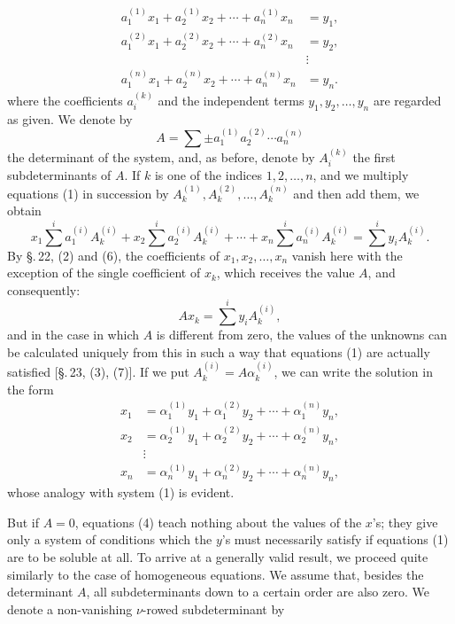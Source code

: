 
\begin{equation}
\begin{aligned}
 a_1^{(1)}x_1+a_2^{(1)}x_2+\cdots+a_n^{(1)}x_n&=y_1,\\
 a_1^{(2)}x_1+a_2^{(2)}x_2+\cdots+a_n^{(2)}x_n&=y_2,\\
 &\vdots\\
 a_1^{(n)}x_1+a_2^{(n)}x_2+\cdots+a_n^{(n)}x_n&=y_n.
\end{aligned}
\tag{1}
\end{equation}
where the coefficients \(a_i^{(k)}\) and the independent terms \(y_1,y_2,\ldots,y_n\) are regarded as given. We denote by
\begin{equation}
        A=\sum\pm a_1^{(1)}a_2^{(2)}\cdots a_n^{(n)}
\tag{2}
\end{equation}
the determinant of the system, and, as before, denote by \(A_i^{(k)}\) the first subdeterminants of \(A\). If \(k\) is one of the indices \(1,2,\ldots,n\), and we multiply equations (1) in succession by \(A_k^{(1)},A_k^{(2)},\ldots,A_k^{(n)}\) and then add them, we obtain
\begin{equation}
 x_1\sum^{i}a_1^{(i)}A_k^{(i)}+
 x_2\sum^{i}a_2^{(i)}A_k^{(i)}+
 \cdots+
 x_n\sum^{i}a_n^{(i)}A_k^{(i)}
 =\sum^{i}y_iA_k^{(i)}.
\tag{3}
\end{equation}
By \S.\,22, (2) and (6), the coefficients of \(x_1,x_2,\ldots,x_n\) vanish here with the exception of the single coefficient of \(x_k\), which receives the value \(A\), and consequently:
\begin{equation}
 A x_k=\sum^{i}y_iA_k^{(i)},
\tag{4}
\end{equation}
and in the case in which \(A\) is different from zero, the values of the unknowns can be calculated uniquely from this in such a way that equations (1) are actually satisfied [\S.\,23, (3), (7)]. If we put \(A_k^{(i)}=A\alpha_k^{(i)}\), we can write the solution in the form
\begin{equation}
\begin{aligned}
 x_1&=\alpha_1^{(1)}y_1+\alpha_1^{(2)}y_2+\cdots+\alpha_1^{(n)}y_n,\\
 x_2&=\alpha_2^{(1)}y_1+\alpha_2^{(2)}y_2+\cdots+\alpha_2^{(n)}y_n,\\
 &\vdots\\
 x_n&=\alpha_n^{(1)}y_1+\alpha_n^{(2)}y_2+\cdots+\alpha_n^{(n)}y_n,
\end{aligned}
\tag{5}
\end{equation}
whose analogy with system (1) is evident.

But if \(A=0\), equations (4) teach nothing about the values of the \(x\)'s; they give only a system of conditions which the \(y\)'s must necessarily satisfy if equations (1) are to be soluble at all. To arrive at a generally valid result, we proceed quite similarly to the case of homogeneous equations. We assume that, besides the determinant \(A\), all subdeterminants down to a certain order are also zero. We denote a non-vanishing \(\nu\)-rowed subdeterminant by
